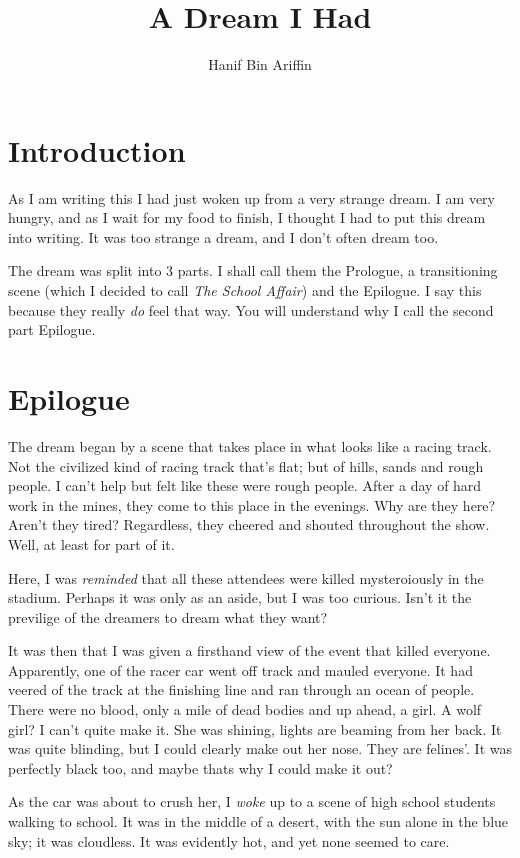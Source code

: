 \documentclass[a4paper,10pt]{article}
\title{A Dream I Had}
\author{Hanif Bin Ariffin}
\begin{document}
\maketitle

\section{Introduction}

As I am writing this I had just woken up from a very strange dream.
I am very hungry, and as I wait for my food to finish, I thought I had to put this dream into writing.
It was too strange a dream, and I don't often dream too.

The dream was split into 3 parts.
I shall call them the Prologue, a transitioning scene (which I decided to call \textit{The School Affair}) and the Epilogue.
I say this because they really \textit{do} feel that way.
You will understand why I call the second part Epilogue.

\section{Epilogue}

The dream began by a scene that takes place in what looks like a racing track.
Not the civilized kind of racing track that's flat; but of hills, sands and rough people.
I can't help but felt like these were rough people.
After a day of hard work in the mines, they come to this place in the evenings.
Why are they here?
Aren't they tired?
Regardless, they cheered and shouted throughout the show.
Well, at least for part of it.

Here, I was \textit{reminded} that all these attendees were killed mysteroiously in the stadium.
Perhaps it was only as an aside, but I was too curious.
Isn't it the previlige of the dreamers to dream what they want?

It was then that I was given a firsthand view of the event that killed everyone.
Apparently, one of the racer car went off track and mauled everyone.
It had veered of the track at the finishing line and ran through an ocean of people.
There were no blood, only a mile of dead bodies and up ahead, a girl.
A wolf girl?
I can't quite make it.
She was shining, lights are beaming from her back.
It was quite blinding, but I could clearly make out her nose.
They are felines'.
It was perfectly black too, and maybe thats why I could make it out?

As the car was about to crush her, I \textit{woke} up to a scene of high school students walking to school.
It was in the middle of a desert, with the sun alone in the blue sky; it was cloudless.
It was evidently hot, and yet none seemed to care.
\end{document}

